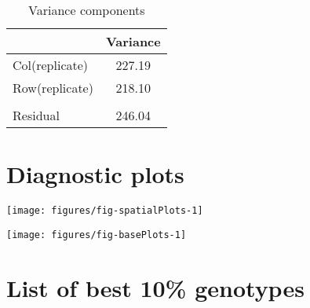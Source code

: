 \documentclass[a4paper,11pt]{article}\usepackage[]{graphicx}\usepackage[]{color}
\makeatletter
\def\maxwidth{ %
  \ifdim\Gin@nat@width>\linewidth
    \linewidth
  \else
    \Gin@nat@width
  \fi
}
\newenvironment{knitrout}{}{} %
\makeatother
\begin{document}
\begin{table}[ht]
\begin{flushleft}
\caption{Variance components} 
\label{varComps}
\begin{tabular}{lc}
  \hline
 & Variance \\ 
  \hline
Col(replicate) & 227.19 \\ 
  Row(replicate) & 218.10 \\ 
   &  \\ 
  Residual & 246.04 \\ 
   \hline
\end{tabular}
\end{flushleft}
\end{table}

\clearpage

\section{Diagnostic plots}
\begin{knitrout}
\color{fgcolor}

{\centering \texttt{[image: figures/fig-spatialPlots-1]} 

}



\end{knitrout}
\newpage
\begin{knitrout}
\color{fgcolor}

{\centering \texttt{[image: figures/fig-basePlots-1]} 

}



\end{knitrout}
\newpage

\section{List of best 10\% genotypes}
\end{document}
